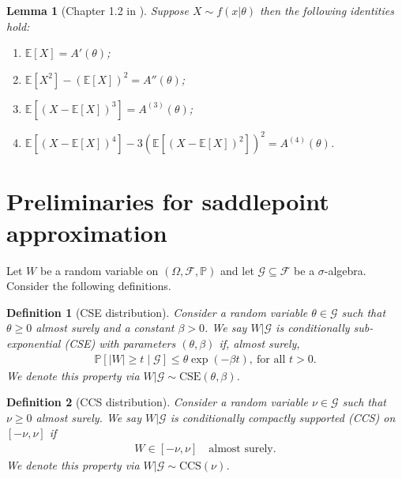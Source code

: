 \documentclass[12pt]{article}
\newtheorem{lemma}{Lemma}
\newtheorem{definition}{Definition}
\theoremstyle{definition}
\def\P{\mathbb{P}}
\def\P{\mathbb{P}}
\newcommand{\E}{\mathbb E}								%
\renewcommand{\P}{\mathbb{P}}							%
\begin{document}
\begin{lemma}[Chapter 1.2 in \cite{Efron2022}]\label{lem:moment_logpartition}
  Suppose $X\sim f(x|\theta)$ then the following identities hold:
  \begin{enumerate}
    \item $\E[X]=A'(\theta)$;
    \item $\E[X^2]-(\E[X])^2=A''(\theta)$;
    \item $\E[(X-\E[X])^3]=A^{(3)}(\theta)$;
    \item $\E[(X-\E[X])^4]-3\left(\E[(X-\E[X])^2]\right)^2=A^{(4)}(\theta)$.
  \end{enumerate}
\end{lemma}


\section{Preliminaries for saddlepoint approximation}\label{sec:saddlepoint_prelim}

Let $W$ be a random variable on $(\Omega, \mathcal F, \P)$ and let $\mathcal G \subseteq \mathcal F$ be a $\sigma$-algebra. Consider the following definitions.

\begin{definition}[CSE distribution]\label{def:cse_distribution}
Consider a random variable $\theta \in \mathcal G$ such that $\theta \geq 0$ almost surely and a constant $\beta > 0$. We say $W|\mathcal{G}$ is \textit{conditionally sub-exponential} (CSE) with parameters $(\theta, \beta)$ if, almost surely,
\begin{align*}
\P\left[|W|\geq t \mid \mathcal{G}\right]\leq \theta\exp(-\beta t),\ \text{for all } t>0.
\end{align*}
We denote this property via $W|\mathcal G \sim \text{CSE}(\theta, \beta)$.
\end{definition}

\begin{definition}[CCS distribution]\label{def:ccs_distribution}
	Consider a random variable $\nu \in \mathcal G$ such that $\nu \geq 0$ almost surely. We say $W|\mathcal{G}$ is \textit{conditionally compactly supported} (CCS) on $[-\nu, \nu]$ if
\begin{align*}
W \in [-\nu,\nu] \quad \text{almost surely}.
\end{align*}
We denote this property via $W|\mathcal G \sim \text{CCS}(\nu)$.
\end{definition}
\end{document}
